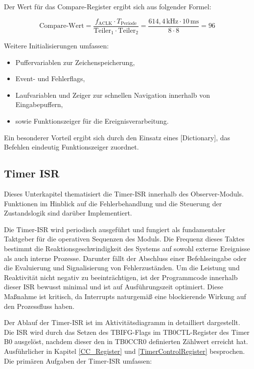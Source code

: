 Der Wert f\"ur das Compare-Register ergibt sich aus folgender Formel:

\[
\text{Compare-Wert} = \frac{f_\text{ACLK} \cdot T_\text{Periode}}{\text{Teiler}_1 \cdot \text{Teiler}_2} = \frac{614{,}4\,\text{kHz} \cdot 10\,\text{ms}}{8 \cdot 8} = 96
\]

Weitere Initialisierungen umfassen:
\begin{itemize}
	\item Puffervariablen zur Zeichenspeicherung,
	\item Event- und Fehlerflags,
	\item Laufvariablen und Zeiger zur schnellen Navigation innerhalb von Eingabepuffern,
	\item sowie Funktionszeiger f\"ur die Ereignisverarbeitung.
\end{itemize}

Ein besonderer Vorteil ergibt sich durch den Einsatz eines [Dictionary], das Befehlen eindeutig Funktionszeiger zuordnet.

\newpage
\subsection{Timer ISR}
\label{Timer_ISR}

Dieses Unterkapitel thematisiert die Timer-ISR innerhalb des Observer-Moduls. Funktionen im Hinblick auf die Fehlerbehandlung und die Steuerung der Zustandslogik sind dar\"uber Implementiert.

Die Timer-ISR wird periodisch ausgef\"uhrt und fungiert als fundamentaler Taktgeber f\"ur die operativen Sequenzen des Moduls. Die Frequenz dieses Taktes bestimmt die Reaktionsgeschwindigkeit des Systems auf sowohl externe Ereignisse als auch interne Prozesse. Darunter f\"allt der Abschluss einer Befehlseingabe oder die Evaluierung und Signalisierung von Fehlerzust\"anden. Um die Leistung und Reaktivit\"at nicht negativ zu beeintr\"achtigen, ist der Programmcode innerhalb dieser ISR bewusst minimal und ist auf Ausf\"uhrungszeit optimiert. Diese Ma{\ss}nahme ist kritisch, da Interrupts naturgem\"a{\ss} eine blockierende Wirkung auf den Prozessfluss haben.

Der Ablauf der Timer-ISR ist im Aktivit\"atsdiagramm in  detailliert dargestellt. Die ISR wird durch das Setzen des TBIFG-Flags im TB0CTL-Register des Timer B0 ausgel\"ost, nachdem dieser den in TB0CCR0 definierten Z\"ahlwert erreicht hat. Ausf\"uhrlicher in Kapitel \ref{CC_Register} und \ref{TimerControlRegister} besprochen. Die prim\"aren Aufgaben der Timer-ISR umfassen:

